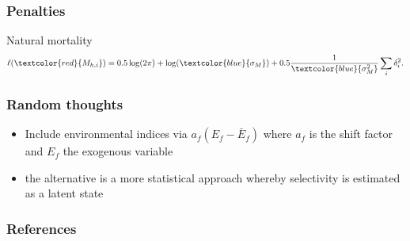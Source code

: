 \documentclass{beamer}
\begin{document}

\begin{frame}
\frametitle{Penalties}
Natural mortality
\begin{equation*}
  \ell(\textcolor{red}{M_{h,i}}) = 
  0.5 \log (2 \pi) + \log (\textcolor{blue}{\sigma_{M}}) + 0.5
  \frac{1}{\textcolor{blue}{\sigma^2_{M}}} \sum_i
  \delta_i^2.
\end{equation*}
\end{frame}


\begin{frame}
\frametitle{Random thoughts}
\begin{itemize}
\item Include environmental indices via $a_f (E_f - \bar{E}_f)$ where $a_f$ is
  the shift factor and $E_f$ the exogenous variable
\item the alternative is a more statistical approach whereby selectivity is
  estimated as a latent state
\end{itemize}
\end{frame}


\begin{frame}
\frametitle{References}


\end{frame}

\end{document}
